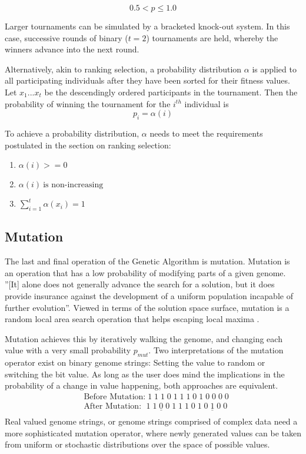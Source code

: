 \documentclass[11pt,a4paper,twoside,openright]{scrbook}
\begin{document}
\[0.5 < p \leq 1.0\]

Larger tournaments can be simulated by a bracketed knock-out system. In this case, successive rounds of binary (\(t = 2\)) tournaments are held, whereby the winners advance into the next round.

Alternatively, akin to ranking selection, a probability distribution \(\alpha\) is applied to all participating individuals after they have been sorted for their fitness values. Let \(x_1 ... x_t\) be the descendingly ordered participants in the tournament. Then the probability of winning the tournament for the \(i^{th}\) individual is \[p_i = \alpha (i)\]

To achieve a probability distribution, \(\alpha\) needs to meet the requirements postulated in the section on ranking selection:
\begin{enumerate}
  \item \(\alpha (i) >= 0\)
  \item \(\alpha (i) \ \text{is\ non-increasing}\)
  \item \(\sum_{i=1}^t\alpha (x_i) = 1\)
\end{enumerate}


\subsection{Mutation}
The last and final operation of the Genetic Algorithm is mutation. Mutation is an operation that has a low probability of modifying parts of a given genome. ''[It] alone does not generally advance the search for a solution, but it does provide insurance against the development of a uniform population incapable of further evolution''\cite[p.\,68]{Holland75}. Viewed in terms of the solution space surface, mutation is a random local area search operation that helps escaping local maxima \cite{Lee00}.

Mutation achieves this by iteratively walking the genome, and changing each value with a very small probability \(p_{mut}\).
Two interpretations of the mutation operator exist on binary genome strings: Setting the value to random or switching the bit value. As long as the user does mind the implications in the probability of a change in value happening, both approaches are equivalent.\\
\begin{equation*}
  \begin{aligned}
    & \text{Before Mutation:} \;1\;1\;1\;0\;1\;1\;1\;0\;1\;0\;0\;0\;0 \\
    & \text{After Mutation:} \ \ \,1\;1\;\underline{0}\;0\;1\;1\;1\;0\;1\;0\;\underline{1}\;0\;0\\
  \end{aligned}
\end{equation*}
Real valued genome strings, or genome strings comprised of complex data need a more sophisticated mutation operator, where newly generated values can be taken from uniform or stochastic distributions over the space of possible values.
\end{document}
